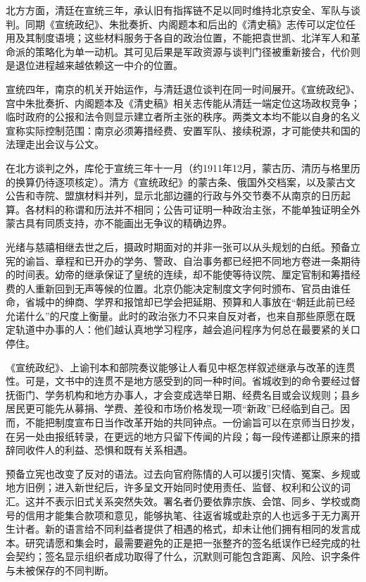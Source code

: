 北方方面，清廷在宣统三年，承认旧有指挥链不足以同时维持北京安全、军队与谈判。同期《宣统政纪》、朱批奏折、内阁题本和后出的《清史稿》志传可以定位任用及其制度语境；这些材料服务于各自的政治位置，不能把袁世凯、北洋军人和革命派的策略化为单一动机。其可见后果是军政资源与谈判门径被重新接合，代价则是退位进程越来越依赖这一中介的位置。

宣统四年，南京的机关开始运作，与清廷退位谈判在同一时间展开。《宣统政纪》、宫中朱批奏折、内阁题本及《清史稿》相关志传能从清廷一端定位这场政权竞争；临时政府的公报和法令则显示建立者所主张的秩序。两类文本均不能以自身的名义宣称实际控制范围：南京必须筹措经费、安置军队、接续税源，才可能使共和国的法理走出会议与公文。

在北方谈判之外，库伦于宣统三年十一月（约1911年12月，蒙古历、清历与格里历的换算仍待逐项核定）。清方《宣统政纪》的蒙古条、俄国外交档案，以及蒙古文公告和寺院、盟旗材料并列，显示北部边疆的行政与外交节奏不从南京的日历起算。各材料的称谓和历法并不相同；公告可证明一种政治主张，不能单独证明全外蒙古具有同质支持，亦不能画出无争议的精确边界。

光绪与慈禧相继去世之后，摄政时期面对的并非一张可以从头规划的白纸。预备立宪的谕旨、章程和已开办的学务、警政、自治事务都已经把不同地方卷进一条期待的时间表。幼帝的继承保证了皇统的连续，却不能使等待议院、厘定官制和筹措经费的人重新回到无声等候的位置。北京仍能决定制度文字何时颁布、官员由谁任命，省城中的绅商、学界和报馆却已学会把延期、预算和人事放在“朝廷此前已经允诺什么”的尺度上衡量。此时的政治张力不只来自反对者，也来自那些原愿在既定轨道中办事的人：他们越认真地学习程序，越会追问程序为何总在最要紧的关口停住。

《宣统政纪》、上谕刊本和部院奏议能够让人看见中枢怎样叙述继承与改革的连贯性。可是，文书中的连贯不是地方感受到的同一种时间。省城收到的命令要经过督抚衙门、学务机构和地方办事人，才会变成选举日期、经费名目或会议规则；县乡居民更可能先从募捐、学费、差役和市场价格发现一项“新政”已经临到自己。因而，不能把制度宣布日当作改革开始的共同钟点。一份谕旨可以在京师当日抄发，在另一处由报纸转录，在更远的地方只留下传闻的片段；每一段传递都让原来的措辞同收件人的利益、恐惧和既有关系相遇。

预备立宪也改变了反对的语法。过去向官府陈情的人可以援引灾情、冤案、乡规或地方旧例；进入新世纪后，许多呈文开始同时使用责任、监督、权利和公议的词汇。这并不表示旧式关系突然失效。署名者仍要依靠宗族、会馆、同乡、学校或商号的信用才能集合款项和意见，能够执笔、往返省城或赴京的人也远多于无力离开生计者。新的语言给不同利益者提供了相遇的格式，却未让他们拥有相同的发言成本。研究请愿和集会时，最需要避免的正是把一张整齐的签名纸误作已经完成的社会契约；签名显示组织者成功取得了什么，沉默则可能包含距离、风险、识字条件与未被保存的不同判断。


